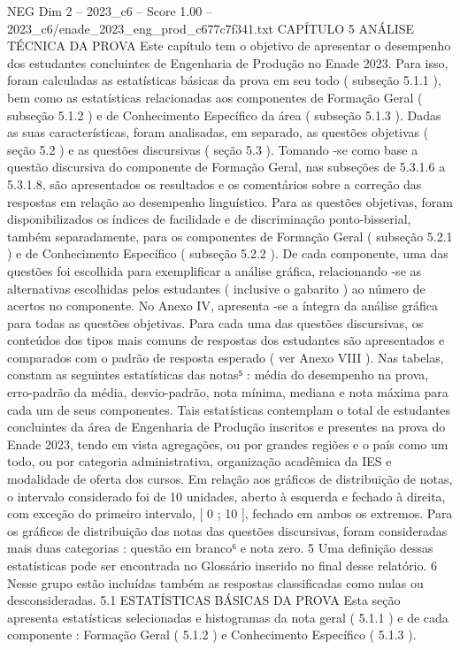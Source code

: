 \begin{textsample}{NEG Dim 2 – 2023\_c6 – Score 1.00 – 2023\_c6/enade\_2023\_eng\_prod\_c677c7f341.txt}  \label{ex:f2_neg_268}
CAPÍTULO 5 ANÁLISE TÉCNICA DA PROVA Este capítulo tem o objetivo de apresentar o desempenho dos estudantes concluintes de Engenharia de Produção no Enade 2023.
Para isso, foram calculadas as estatísticas básicas da prova em seu todo ( subseção 5.1.1 ), bem como as estatísticas relacionadas aos componentes de Formação Geral ( subseção 5.1.2 ) e de Conhecimento Específico da área ( subseção 5.1.3 ).
Dadas as suas características, foram analisadas, em separado, as questões objetivas ( seção 5.2 ) e as questões discursivas ( seção 5.3 ).
Tomando -se como base a questão discursiva do componente de Formação Geral, nas subseções de 5.3.1.6 a 5.3.1.8, são apresentados os resultados e os comentários sobre a correção das respostas em relação ao desempenho linguístico.
Para as questões objetivas, foram disponibilizados os índices de facilidade e de discriminação ponto-bisserial, também separadamente, para os componentes de Formação Geral ( subseção 5.2.1 ) e de Conhecimento Específico ( subseção 5.2.2 ).
De cada componente, uma das questões foi escolhida para exemplificar a análise gráfica, relacionando -se as alternativas escolhidas pelos estudantes ( inclusive o gabarito ) ao número de acertos no componente.
No Anexo IV, apresenta -se a íntegra da análise gráfica para todas as questões objetivas.
Para cada uma das questões discursivas, os conteúdos dos tipos mais comuns de respostas dos estudantes são apresentados e comparados com o padrão de resposta esperado ( ver Anexo VIII ).
Nas tabelas, constam as seguintes estatísticas das notas⁵ : média do desempenho na prova, erro-padrão da média, desvio-padrão, nota mínima, mediana e nota máxima para cada um de seus componentes.
Tais estatísticas contemplam o total de estudantes concluintes da área de Engenharia de Produção inscritos e presentes na prova do Enade 2023, tendo em vista agregações, ou por grandes regiões e o país como um todo, ou por categoria administrativa, organização acadêmica da IES e modalidade de oferta dos cursos.
Em relação aos gráficos de distribuição de notas, o intervalo considerado foi de 10 unidades, aberto à esquerda e fechado à direita, com exceção do primeiro intervalo, [ 0 ; 10 ], fechado em ambos os extremos.
Para os gráficos de distribuição das notas das questões discursivas, foram consideradas mais duas categorias : questão em branco⁶ e nota zero. 5 Uma definição dessas estatísticas pode ser encontrada no Glossário inserido no final desse relatório. 6 Nesse grupo estão incluídas também as respostas classificadas como nulas ou desconsideradas. 5.1 ESTATÍSTICAS BÁSICAS DA PROVA Esta seção apresenta estatísticas selecionadas e histogramas da nota geral ( 5.1.1 ) e de cada componente : Formação Geral ( 5.1.2 ) e Conhecimento Específico ( 5.1.3 ).

\end{textsample}
